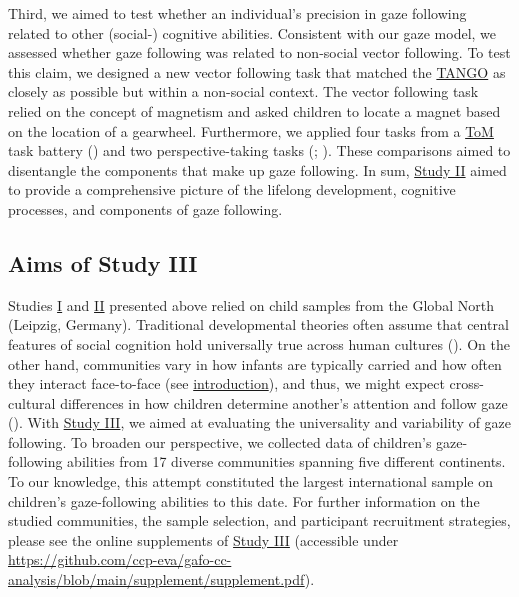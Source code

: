 \documentclass[
]{scrbook}
\begin{document}
Third, we aimed to test whether an individual's precision in gaze following related to other (social-) cognitive abilities. Consistent with our gaze model, we assessed whether gaze following was related to non-social vector following. To test this claim, we designed a new vector following task that matched the \hyperref[acronyms_TANGO]{TANGO} as closely as possible but within a non-social context. The vector following task relied on the concept of magnetism and asked children to locate a magnet based on the location of a gearwheel. Furthermore, we applied four tasks from a \hyperref[acronyms_ToM]{ToM} task battery () and two perspective-taking tasks (; ). These comparisons aimed to disentangle the components that make up gaze following. In sum, \hyperref[studyII]{Study II} aimed to provide a comprehensive picture of the lifelong development, cognitive processes, and components of gaze following.

\subsection{Aims of Study III}\label{aims-studyIII}

Studies \hyperref[studyI]{I} and \hyperref[studyII]{II} presented above relied on child samples from the Global North (Leipzig, Germany). Traditional developmental theories often assume that central features of social cognition hold universally true across human cultures (). On the other hand, communities vary in how infants are typically carried and how often they interact face-to-face (see \hyperref[intro-gaze-cc]{introduction}), and thus, we might expect cross-cultural differences in how children determine another's attention and follow gaze (). With \hyperref[studyIII]{Study III}, we aimed at evaluating the universality and variability of gaze following. To broaden our perspective, we collected data of children's gaze-following abilities from 17 diverse communities spanning five different continents. To our knowledge, this attempt constituted the largest international sample on children's gaze-following abilities to this date. For further information on the studied communities, the sample selection, and participant recruitment strategies, please see the online supplements of \hyperref[studyIII]{Study III} (accessible under \url{https://github.com/ccp-eva/gafo-cc-analysis/blob/main/supplement/supplement.pdf}).
\end{document}

